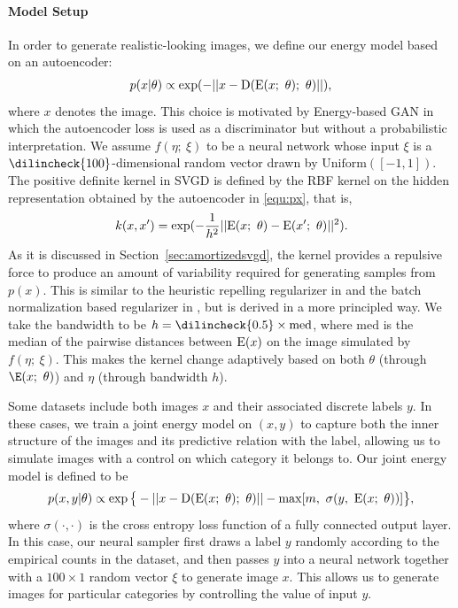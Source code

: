 \paragraph{Model Setup} In order to generate realistic-looking images, we define our energy model based on an autoencoder: 
\begin{align}\label{equ:px}
p(x|\theta) \propto \exp(-  || x -   \mathrm{D}(\mathrm{E}(x;~ \theta);~\theta) ||), 
\end{align}
where $x$ denotes the image. 
This choice is motivated by Energy-based GAN \citep{zhao2016energy} in which the autoencoder loss is used as a discriminator but without a probabilistic interpretation. 
We assume $f(\eta;~\xi)$ to be a neural network whose input $\xi$ is a $\dilincheck{100}$-dimensional random vector drawn by $\mathrm{Uniform}([-1,1])$. 
The positive definite kernel in SVGD is defined by the RBF kernel on the hidden representation obtained by the autoencoder in \eqref{equ:px}, that is, 
$$
k(x, x') = \exp(-\frac{1}{h^2} ||\mathrm{E}(x;~\theta) - \mathrm{E}(x';~\theta)||^2). 
$$
As it is discussed in Section~\ref{sec:amortizedsvgd}, the kernel provides a repulsive force 
to produce an amount of variability required for generating samples from $p(x)$. 
This is similar to the heuristic repelling regularizer in \citet{zhao2016energy} and the batch normalization based regularizer in \citet{kim2016deep}, but is derived in a more principled way. 
We take the bandwidth to be $h = \dilincheck{0.5}\times \mathrm{med}$, where $\mathrm{med}$ is the median of the pairwise distances between $\mathrm{E}(x)$ on the image simulated by $f(\eta;~ \xi)$. 
This makes the kernel change adaptively based on both $\theta$ (through $\E(x;~\theta)$) and $\eta$ (through bandwidth $h$). 

Some datasets include both images $x$ and 
their associated discrete labels $y$. In these cases, we train a joint energy model on $(x,y)$ 
to capture both the inner structure of the images and its predictive relation with the label,  allowing us to simulate images 
with a control on which category it belongs to. Our joint energy model is defined to be 
\begin{align}\label{equ:pxy}
p(x, y|\theta) \propto \exp\big \{-  || x -   \dec(\enc(x;~\theta);~\theta) || - \max[m,~\sigma(y, ~ \enc(x;~\theta))]\big \},  %
\end{align}
where $\sigma(\cdot,\cdot)$ is the cross entropy loss function of a fully connected output layer. 
In this case, our neural sampler first draws a label $y$ randomly according to the empirical counts in the dataset, 
and then passes $y$ into a neural network together with a $100\times 1$ random vector $\xi$ to generate image $x$. 
This allows us to generate images for particular categories by controlling the value of input $y$. 

